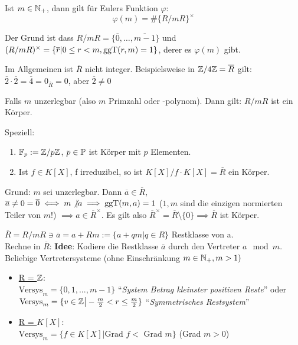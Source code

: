 \documentclass[a4paper,DIV15,BCOR12mm]{article}
\begin{document}
\begin{folgerung}
Ist $m\in \mathbb{N}_+$, dann gilt für Eulers Funktion $\varphi$:
\[ \varphi(m) = \#\{R/mR\}^\times \]
\end{folgerung}

Der Grund ist dass $R/mR = \{\overline 0, \ldots, \overline {m-1}\}$
und $(R/mR)^\times = \{\overline r | 0 \le r < m, \mathop{\rm ggT}\nolimits(r,m)=1\}$,
derer es $\varphi(m)$ gibt.

Im Allgemeinen ist $\overline R$ nicht integer. Beispielsweise in
$\mathbb{Z}/4\mathbb{Z}=\overline R$ gilt: $\overline 2 \cdot \overline 2 =
\overline 4 = 0_{\overline R} = 0$, aber $\overline 2 \ne 0$

\begin{folgerung}
Falls $m$ unzerlegbar (also $m$ Primzahl oder -polynom). Dann gilt:
$R/mR$ ist ein Körper.
\end{folgerung}

Speziell:
\begin{enumerate}
\item  $\mathbb{F}_p := \mathbb{Z}/p\mathbb{Z}$, $p\in\mathbb{P}$ ist Körper mit $p$ Elementen.
\item Ist $f\in K[X]$, f irreduzibel, so ist $K[X]/f\cdot K[X] = \overline R$ ein Körper.
\end{enumerate}

Grund: $m$ sei unzerlegbar. Dann $\overline a \in \overline R,$
$\overline a\ne 0 = \overline 0 \iff m\not|a \implies \mathop{\rm ggT}\nolimits(m,a) = 1$
($1,m$ sind die einzigen normierten Teiler von $m$!) $\implies a \in
\overline R^\times$. Es gilt also $\overline R^\times = \overline
R\setminus\{0\} \implies \overline R$ ist Körper.


$\overline R = R/mR \ni \overline a = a + Rm := \{a + qm \big| q \in R\}$ Restklasse von a.\\
Rechne in $\overline R$:
\textbf{Idee}: Kodiere die Restklasse $\overline a$ durch den Vertreter $a \mod m$.\\

Beliebige Vertretersysteme (ohne Einschränkung $m \in \mathbb{N}_+, m >
1)$
\begin{itemize}
    \item[] \underline{R = $\mathbb{Z}$}: \\$\text{Versys}_m = \{0,1,...,m-1\}$ "`\emph{System Betrag kleinster positiven Reste}"' oder $\text{Versys}_m =\{v \in \mathbb{Z} \big| - \frac{m}{2} < r \le \frac{m}{2}\}$ "`\emph{Symmetrisches Restsystem}"'
    \item[] \underline{R = $K[X]$}: \\$\text{Versys}_m = \{f \in K[X] \big| \text{Grad } f < \text{ Grad } m\}$ (Grad $m > 0$)
\end{itemize}
\end{document}
